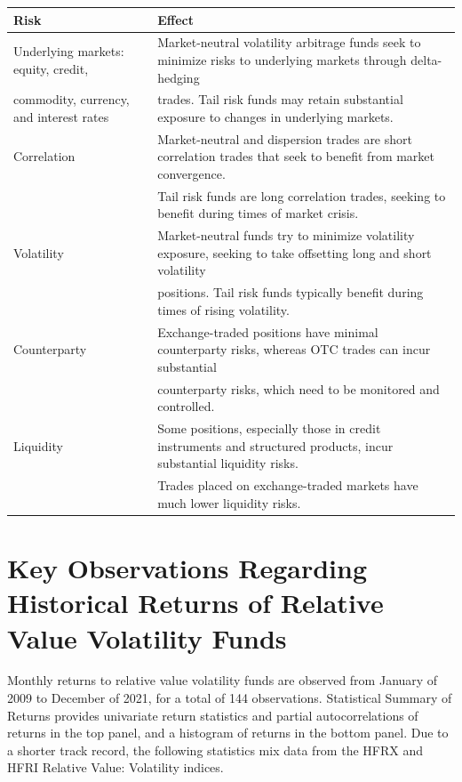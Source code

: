 \documentclass[11pt]{article}
\begin{document}
\begin{center}
\begin{tabular}{|ll|}
\hline
Risk & Effect \\
\hline
Underlying markets: equity, credit, & Market-neutral volatility arbitrage funds seek to minimize risks to underlying markets through delta-hedging \\
commodity, currency, and interest rates & trades. Tail risk funds may retain substantial exposure to changes in underlying markets. \\
Correlation & Market-neutral and dispersion trades are short correlation trades that seek to benefit from market convergence. \\
 & Tail risk funds are long correlation trades, seeking to benefit during times of market crisis. \\
Volatility & Market-neutral funds try to minimize volatility exposure, seeking to take offsetting long and short volatility \\
 & positions. Tail risk funds typically benefit during times of rising volatility. \\
Counterparty & Exchange-traded positions have minimal counterparty risks, whereas OTC trades can incur substantial \\
 & counterparty risks, which need to be monitored and controlled. \\
Liquidity & Some positions, especially those in credit instruments and structured products, incur substantial liquidity risks. \\
 & Trades placed on exchange-traded markets have much lower liquidity risks. \\
\end{tabular}
\end{center}

\section*{Key Observations Regarding Historical Returns of Relative Value Volatility Funds}
Monthly returns to relative value volatility funds are observed from January of 2009 to December of 2021, for a total of 144 observations. Statistical Summary of Returns provides univariate return statistics and partial autocorrelations of returns in the top panel, and a histogram of returns in the bottom panel. Due to a shorter track record, the following statistics mix data from the HFRX and HFRI Relative Value: Volatility indices.
\end{document}
